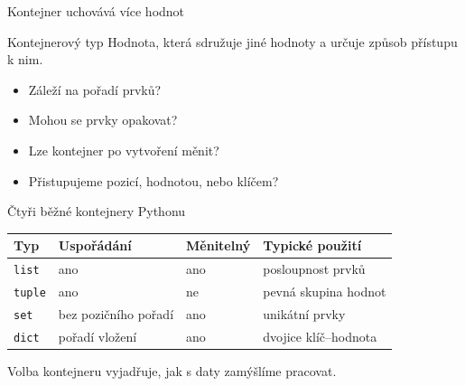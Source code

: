 \documentclass[aspectratio=169]{beamer}
\begin{document}
\begin{frame}{Kontejner uchovává více hodnot}
  \begin{block}{Kontejnerový typ}
    Hodnota, která sdružuje jiné hodnoty a určuje způsob přístupu k nim.
  \end{block}
  \begin{itemize}
    \item Záleží na pořadí prvků?
    \item Mohou se prvky opakovat?
    \item Lze kontejner po vytvoření měnit?
    \item Přistupujeme pozicí, hodnotou, nebo klíčem?
  \end{itemize}
\end{frame}

\begin{frame}{Čtyři běžné kontejnery Pythonu}
  \centering
  \small
  \begin{tabular}{llll}
    \textbf{Typ} & \textbf{Uspořádání} & \textbf{Měnitelný} & \textbf{Typické použití} \\
    \hline
    \texttt{list} & ano & ano & posloupnost prvků \\
    \texttt{tuple} & ano & ne & pevná skupina hodnot \\
    \texttt{set} & bez pozičního pořadí & ano & unikátní prvky \\
    \texttt{dict} & pořadí vložení & ano & dvojice klíč--hodnota \\
  \end{tabular}
  \par
  \normalsize
  \vspace{5mm}
  Volba kontejneru vyjadřuje, jak s daty zamýšlíme pracovat.
\end{frame}
\end{document}

